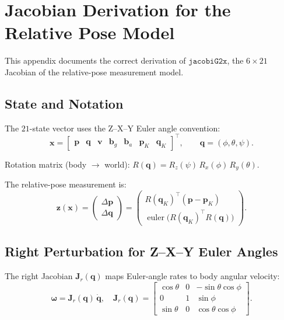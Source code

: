 \documentclass[11pt,a4paper]{article}
\begin{document}
\appendix
\section{Jacobian Derivation for the Relative Pose Model}
\label{sec:jacobi}

This appendix documents the correct derivation of \(\texttt{jacobiG2x}\), the \(6\times21\) Jacobian of the relative-pose measurement model.

\subsection{State and Notation}

The \(21\)-state vector uses the Z--X--Y Euler angle convention:
\[
\mathbf{x} = \begin{bmatrix}
\mathbf{p} & \mathbf{q} & \mathbf{v} & \mathbf{b}_g & \mathbf{b}_a & \mathbf{p}_K & \mathbf{q}_K
\end{bmatrix}^\top,
\qquad
\mathbf{q} = (\phi,\theta,\psi).
\]

Rotation matrix (body $\to$ world): \(R(\mathbf{q}) = R_z(\psi)\,R_x(\phi)\,R_y(\theta)\).

The relative-pose measurement is:
\[
\mathbf{z}(\mathbf{x}) = \begin{pmatrix}
\Delta\mathbf{p} \\ \Delta\mathbf{q}
\end{pmatrix}
= \begin{pmatrix}
R(\mathbf{q}_K)^\top(\mathbf{p} - \mathbf{p}_K) \\
\operatorname{euler}\!\big(R(\mathbf{q}_K)^\top R(\mathbf{q})\big)
\end{pmatrix}.
\]

\subsection{Right Perturbation for Z--X--Y Euler Angles}

The right Jacobian \(\mathbf{J}_r(\mathbf{q})\) maps Euler-angle rates to body angular velocity:
\[
\boldsymbol{\omega} = \mathbf{J}_r(\mathbf{q})\,\dot{\mathbf{q}},\quad
\mathbf{J}_r(\mathbf{q}) = 
\begin{bmatrix}
\cos\theta & 0 & -\sin\theta\cos\phi \\
0 & 1 & \sin\phi \\
\sin\theta & 0 & \cos\theta\cos\phi
\end{bmatrix}.
\]
\end{document}
